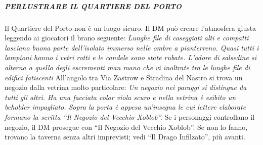\documentclass{article}
\begin{document}
\subparagraph{PERLUSTRARE IL QUARTIERE DEL PORTO}Il Quartiere del Porto non è un luogo sicuro. Il DM può creare l'atmosfera giusta leggendo ai giocatori il brano seguente:\newline
\textit{Lunghe file di caseggiati alti e compatti lasciano buona parte dell'isolato immerso nelle ombre a pianterreno. 
Quasi tutti i lampioni hanno i vetri rotti e le candele sono state rubate. L'odore di salsedine si alterna a quello degli escrementi man mano che vi inoltrate tra le lunghe file di edifici fatiscenti}\newline
All’angolo tra Via Zastrow e Stradina del Nastro si trova un negozio dalla vetrina molto particolare:\newline
\textit{Un negozio nei paraggi si distingue da tutti gli altri. Ha una facciata color viola scuro e nella vetrina è esibito un beholder impagliato. Sopra la porta è appesa un'insegna le cui lettere elaborate formano la scritta “Il Negozio del Vecchio Xoblob”.}\newline
Se i personaggi controllano il negozio, il DM prosegue con “Il Negozio del Vecchio Xoblob”. Se non lo fanno, trovano la taverna senza altri imprevisti; vedi “Il Drago Infilzato”, più avanti.
\end{document}
